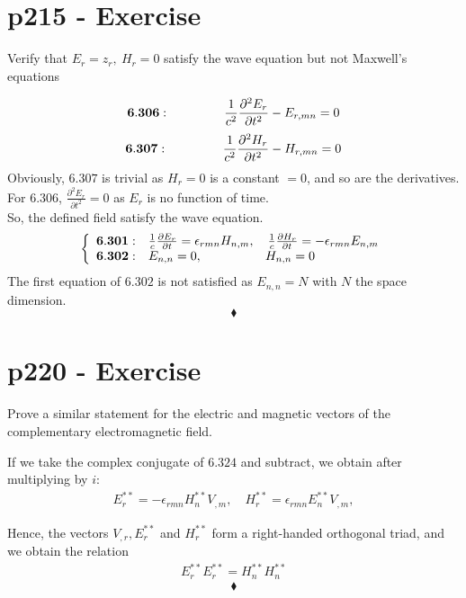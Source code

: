 \section{p215 - Exercise}
\begin{tcolorbox}
Verify that $E_r=z_r, \ H_r=0$ satisfy the wave equation but not Maxwell's equations
\end{tcolorbox}
$$\mathbf{6.306}: \spatie \ \frac{1}{c^2}\frac{\partial^2E_r}{\partial t^2} -E_{r,mn} = 0$$
$$\mathbf{6.307}: \spatie \ \frac{1}{c^2}\frac{\partial^2H_r}{\partial t^2} -H_{r,mn} = 0$$
Obviously, $\mathbf{6.307}$ is trivial as $H_r=0$ is a constant $=0$, and so are the derivatives.\\
For $\mathbf{6.306}$, $ \frac{\partial^2E_r}{\partial t^2}= 0$ as $E_r$ is no function of time.\\
So, the defined field satisfy the wave equation.\\
\begin{align}
\left\{ \begin{array}{ll}
\mathbf{6.301}: &\frac{1}{c}\frac{\partial E_r}{\partial t} = \epsilon_{rmn}H_{n,m}, \quad  \frac{1}{c}\frac{\partial H_r}{\partial t}= -\epsilon_{rmn}E_{n,m}\\
\mathbf{6.302}: & E_{n,n}=0, \quad\quad\quad\quad \quad H_{n,n}=0
\end{array}\right.
\end{align}
The first equation of $\mathbf{6.302}$ is not satisfied as $E_{n,n}= N$ with $N$ the space dimension.
 $$\blacklozenge$$
\newpage

\section{p220 - Exercise}
\begin{tcolorbox}
Prove a similar statement for the electric and magnetic vectors of the complementary electromagnetic field.
\end{tcolorbox}
If we take the complex conjugate of $\mathbf{6.324}$ and subtract, we obtain after multiplying by $i$:
\begin{align}
E^{**}_r = -\epsilon_{rmn}H^{**}_nV_{,m}, \quad H^{**}_r = \epsilon_{rmn}E^{**}_nV_{,m}, 
\end{align} 

Hence, the vectors $V_{,r}, E^{**}_r$ and $ H^{**}_r$ form a right-handed orthogonal triad, and we obtain the relation
\begin{align}
E^{**}_rE^{**}_r=H^{**}_nH^{**}_n
\end{align}
 $$\blacklozenge$$
\newpage


